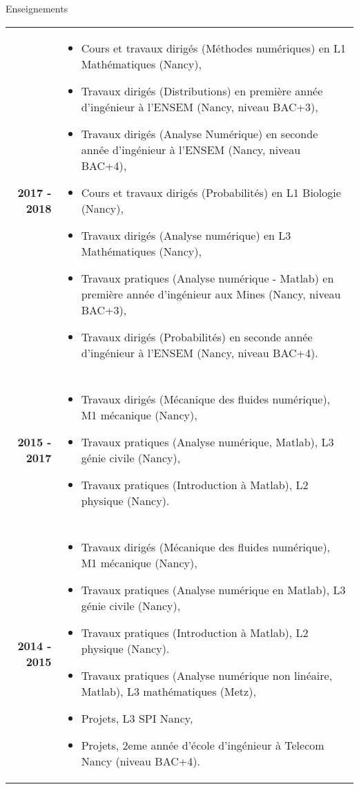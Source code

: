 \documentclass[10pt,a4paper]{report}
\def\cvpart{\noindent \hrulefill}
\def\sp{\vspace{6mm}}
\begin{document}
\sp
{\selectfont
\begin{Large}
Enseignements
\end{Large}
\cvpart
}
\sp

\noindent
\begin{center}
\begin{tabular}{r p{12cm}}
\textbf{2017 - 2018} & \begin{itemize}
\item Cours et travaux dirigés (Méthodes numériques) en L1 Mathématiques (Nancy),
\item Travaux dirigés (Distributions) en première année d'ingénieur à l'ENSEM (Nancy, niveau BAC+3),
\item Travaux dirigés (Analyse Numérique) en seconde année d'ingénieur à l'ENSEM (Nancy, niveau BAC+4),
\item Cours et travaux dirigés (Probabilités) en L1 Biologie (Nancy),
\item Travaux dirigés (Analyse numérique) en L3 Mathématiques (Nancy),
\item Travaux pratiques (Analyse numérique - Matlab) en première année d'ingénieur aux Mines (Nancy, niveau BAC+3),
\item Travaux dirigés (Probabilités) en seconde année d'ingénieur à l'ENSEM (Nancy, niveau BAC+4).
\end{itemize}\\

& \\

\textbf{2015 - 2017} & \begin{itemize}
\item Travaux dirigés (Mécanique des fluides numérique), M1 mécanique (Nancy),
\item Travaux pratiques (Analyse numérique, Matlab), L3 génie civile (Nancy),
\item Travaux pratiques (Introduction à Matlab), L2 physique (Nancy).
\end{itemize}\\

& \\

\textbf{2014 - 2015} & \begin{itemize}
\item Travaux dirigés (Mécanique des fluides numérique), M1 mécanique (Nancy),
\item Travaux pratiques (Analyse numérique en Matlab), L3 génie civile (Nancy),
\item Travaux pratiques (Introduction à Matlab), L2 physique (Nancy).
\item Travaux pratiques (Analyse numérique non linéaire, Matlab), L3 mathématiques (Metz),
\item Projets, L3 SPI Nancy,
\item Projets, 2eme année d'école d'ingénieur à Telecom Nancy (niveau BAC+4).
\end{itemize}\\


\end{tabular}
\end{center}
\end{document}
